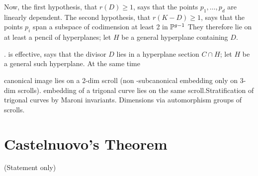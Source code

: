 Now, the first hypothesis, that $r(D) \geq 1$, says that the points $p_1,\dots,p_d$ are linearly dependent. The second hypothesis, that $r(K-D) \geq 1$, says that the points $p_i$ span a subspace of codimension at least 2 in ${\mathbb P}^{g-1}$ They therefore lie on at least a pencil of hyperplanes; let $H$ be a general hyperplane containing $D$.




. is effective, says that the divisor $D$ lies in a hyperplane section $C \cap H$; let $H$ be a general such hyperplane. At the same time 

canonical image lies on a 2-dim scroll (non -subcanonical embedding only on 3-dim scrolls).  embedding of a trigonal curve lies on the same scroll.Stratification of trigonal curves by Maroni invariants. Dimensions via automorphism groups of scrolls.

\section{Castelnuovo's Theorem}
(Statement only) 

